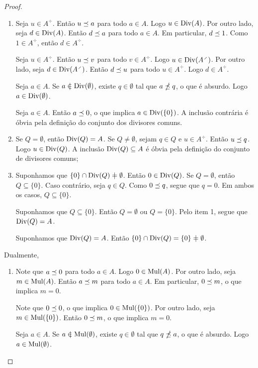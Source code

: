 \begin{proof}
	\begin{enumerate}
	\item Seja $u \in A^{\div}$. Então $u \preceq a$ para todo $a \in A$. Logo $u \in \operatorname{Div}(A)$. Por outro lado, seja $d \in \operatorname{Div}(A)$. Então $d \preceq a$ para todo $a \in A$. Em particular, $d \preceq 1$. Como $1 \in A^{\div}$, então $d \in A^{\div}$.

	Seja $u \in A^{\div}$. Então $u \preceq v$ para todo $v \in A^{\div}$. Logo $u \in \divv(A^{\div})$. Por outro lado, seja $d \in \divv(A^{\div})$. Então $d \preceq u$ para todo $u \in A^{\div}$. Logo $d \in A^{\div}$.

	Seja $a \in A$. Se $a \notin \divv(\emptyset)$, existe $q \in \emptyset$ tal que $a \npreceq q$, o que é absurdo. Logo $a \in \operatorname{Div}(\emptyset)$.

	Seja $a \in A$. Então $a \preceq 0$, o que implica $a \in \operatorname{Div}(\{0\})$. A inclusão contrária é óbvia pela definição do conjunto dos divisores comuns.

	\item Se $Q = \emptyset$, então $\operatorname{Div}(Q) = A$. Se $Q \neq \emptyset$, sejam $q \in Q$ e $u \in A^{\div}$. Então $u \preceq q$. Logo $u \in \operatorname{Div}(Q)$. A inclusão $\operatorname{Div}(Q) \subseteq A$ é óbvia pela definição do conjunto de divisores comuns;

	\item Suponhamos que $\{0\} \cap \divv(Q) \neq \emptyset$. Então $0 \in \operatorname{Div}(Q)$. Se $Q = \emptyset$, então $Q \subseteq \{0\}$. Caso contrário, seja $q \in Q$. Como $0 \preceq q$, segue que $q=0$. Em ambos os casos, $Q \subseteq \{0\}$.

	Suponhamos que $Q \subseteq \{0\}$. Então $Q=\emptyset$ ou $Q=\{0\}$. Pelo item 1, segue que $\operatorname{Div}(Q)=A$.

	Suponhamos que $\operatorname{Div}(Q)=A$. Então $\{0\} \cap \divv(Q) = \{0\} \neq \emptyset$.
	\end{enumerate}

Dualmente,
	\begin{enumerate}
	\item Note que $a \preceq 0$ para todo $a \in A$. Logo $0 \in \operatorname{Mul}(A)$. Por outro  lado, seja $m \in \operatorname{Mul}(A)$. Então $a \preceq m$ para todo $a \in A$. Em particular, $0 \preceq m$, o que implica $m=0$.

	Note que $0 \preceq 0$, o que implica $0 \in \operatorname{Mul}(\{0\})$. Por outro lado, seja $m \in \operatorname{Mul}(\{0\})$. Então $0 \preceq m$, o que implica $m=0$.

	Seja $a \in A$. Se $a \notin \mul(\emptyset)$, existe $q \in \emptyset$ tal que $q \npreceq a$, o que é absurdo. Logo $a \in \operatorname{Mul}(\emptyset)$.


\end{enumerate}
\end{proof}
